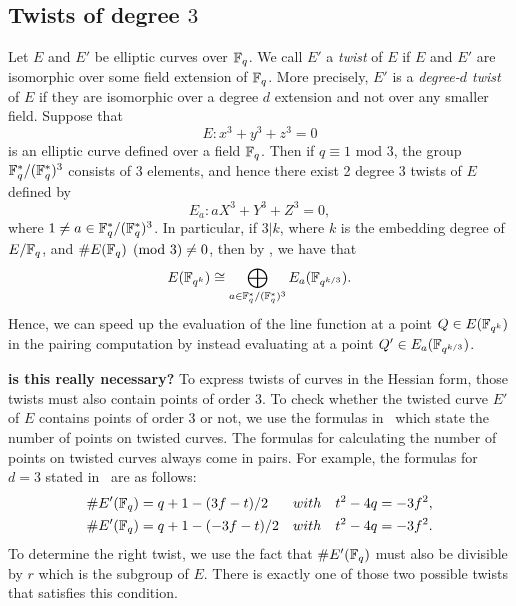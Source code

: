 \subsection{Twists of degree $3$}
\label{twist}
Let $E$ and $E'$ be elliptic curves over $\mathbb{F}_{q}$.
We call $E'$ a \emph{twist} of $E$ if $E$ and $E'$ are isomorphic over some field extension of $\mathbb{F}_{q}$.
More precisely, $E'$ is a {\emph{degree-$d$ twist}} of $E$ if they are isomorphic over a degree $d$ extension and not over any smaller field. Suppose that
\[E: x^{3} + y^{3} + z^{3} = 0\] is an elliptic curve defined over a field $\mathbb{F}_{q}$. Then if $q \equiv 1 \text{ mod } 3$, the group $\mathbb{F}_{q}^{*}/(\mathbb{F}_{q}^{*})^{3}$ consists of 3 elements, and hence there exist 2 degree 3 twists of $E$ defined by
\[E_{a}: aX^{3} + Y^{3} + Z^{3} = 0,\] where $1 \neq a \in \mathbb{F}_{q}^{*}/(\mathbb{F}_{q}^{*})^{3}$. In particular, if $3|k$, where $k$ is the embedding degree of $E/\mathbb{F}_{q}$, and $\#E(\mathbb{F}_{q}) \pmod{3} \neq 0$, then by \cite[Theorem 3]{Hess, Smart, Vercauteren}, we have that
\[E(\mathbb{F}_{q^{k}}) \cong \bigoplus_{a \in \mathbb{F}_{q}^{*}/(\mathbb{F}_{q}^{*})^{3}} E_{a}(\mathbb{F}_{q^{k/3}}).\] Hence, we can speed up the evaluation of the line function at a point $Q \in E(\mathbb{F}_{q^{k}})$ in the pairing computation by instead evaluating at a point $Q' \in E_{a}(\mathbb{F}_{q^{k/3}})$.


\textbf{is this really necessary?}
To express twists of curves in the Hessian form,
those twists must also contain points of order 3.
To check whether the twisted curve $E'$ of $E$ contains points of order 3 or not,
we use the formulas in~\cite{2006/hess} which state the number of points on twisted curves.
The formulas for calculating the number of points on twisted curves always come in pairs.
For example, the formulas for $d = 3$ stated in~\cite{2006/hess} are as follows:
\begin{align*}
\# E' (\mathbb{F}_{q}) &= q + 1 - (3f - t) / 2 & with & \quad t^2 - 4q = -3f^2, \\
\# E' (\mathbb{F}_{q}) &= q + 1 - (-3f- t) / 2 & with & \quad t^2 - 4q = -3f^2.
\end{align*}
To determine the right twist,
we use the fact that $\#E'(\mathbb{F}_{q})$ must also be divisible by $r$ which is the subgroup of $E$.
There is exactly one of those two possible twists that satisfies this condition.

